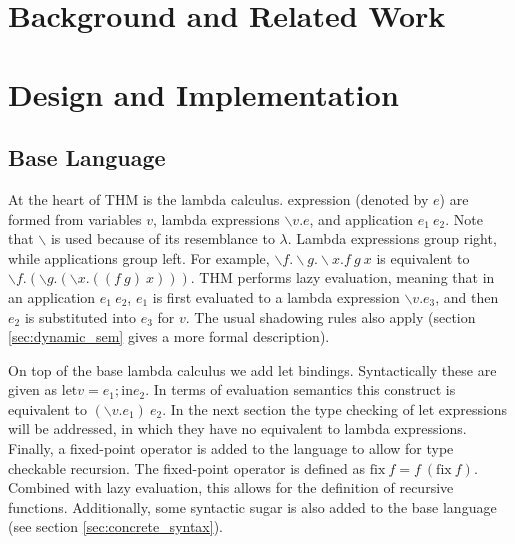 \documentclass[12pt]{article}
\newcommand{\lf}{\backslash}
\begin{document}
\section{Background and Related Work}







\section{Design and Implementation}

\subsection{Base Language}

At the heart of THM is the lambda calculus.
expression (denoted by $e$) are formed from variables $v$,
lambda expressions $\lf v. e$, and application $e_1~e_2$.
Note that $\lf$ is used because of its resemblance to $\lambda$.
Lambda expressions group right, while applications group left.
For example, $\lf f. \lf g. \lf x. f~g~x$ is equivalent to
$\lf f. (\lf g. (\lf x. ((f~g)~x)))$.
THM performs lazy evaluation, meaning that in an application
$e_1~e_2$, $e_1$ is first evaluated to a lambda expression
$\lf v. e_3$, and then $e_2$ is substituted into $e_3$ for $v$.
The usual shadowing rules also apply (section \ref{sec:dynamic_sem}
gives a more formal description).

On top of the base lambda calculus we add let bindings.
Syntactically these are given as
$\mathrm{let} v = e_1; \mathrm{in} e_2$.
In terms of evaluation semantics this construct is equivalent to
$(\lf v. e_1)~e_2$.
In the next section the type checking of let expressions will be
addressed, in which they have no equivalent to lambda expressions.
Finally, a fixed-point operator is added to the language to allow for
type checkable recursion.
The fixed-point operator is defined as
$\mathrm{fix}~f = f~(\mathrm{fix}~f)$.
Combined with lazy evaluation, this allows for the definition of
recursive functions.
Additionally, some syntactic sugar is also added to the base language
(see section \ref{sec:concrete_syntax}).
\end{document}
